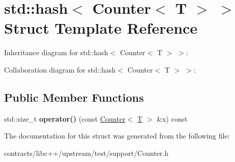 \hypertarget{structstd_1_1hash_3_01_counter_3_01_t_01_4_01_4}{}\section{std\+:\+:hash$<$ Counter$<$ T $>$ $>$ Struct Template Reference}
\label{structstd_1_1hash_3_01_counter_3_01_t_01_4_01_4}


Inheritance diagram for std\+:\+:hash$<$ Counter$<$ T $>$ $>$\+:


Collaboration diagram for std\+:\+:hash$<$ Counter$<$ T $>$ $>$\+:
\subsection*{Public Member Functions}
\begin{DoxyCompactItemize}
\item 
\mbox{\label{structstd_1_1hash_3_01_counter_3_01_t_01_4_01_4_a5715aa166cf6395ac9993e5284501cf2}} 
std\+::size\+\_\+t {\bfseries operator()} (const \mbox{\hyperlink{class_counter}{Counter}}$<$ \mbox{\hyperlink{struct_t}{T}} $>$ \&x) const
\end{DoxyCompactItemize}


The documentation for this struct was generated from the following file\+:\begin{DoxyCompactItemize}
\item 
contracts/libc++/upstream/test/support/Counter.\+h\end{DoxyCompactItemize}
